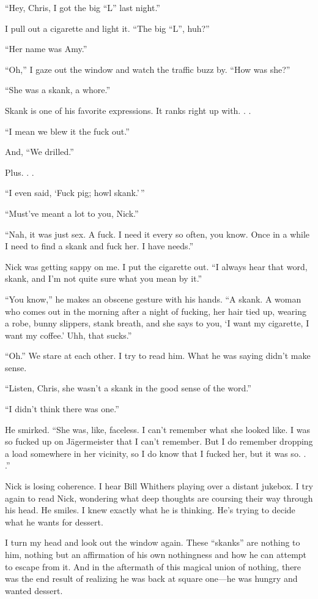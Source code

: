 ``Hey, Chris, I got the big ``L'' last night.''

I pull out a cigarette and light it. ``The big ``L'', huh?''

``Her name was Amy.''

``Oh,'' I gaze out the window and watch the traffic buzz by. ``How was
she?''

``She was a skank, a whore.''

Skank is one of his favorite expressions. It ranks right up with. . .

``I mean we blew it the fuck out.''

And, ``We drilled.''

Plus. . .

``I even said, `Fuck pig; howl skank.'\,''

``Must've meant a lot to you, Nick.''

``Nah, it was just sex. A fuck. I need it every so often, you know. Once
in a while I need to find a skank and fuck her. I have needs.''

Nick was getting sappy on me. I put the cigarette out. ``I always hear
that word, skank, and I'm not quite sure what you mean by it.''

``You know,'' he makes an obscene gesture with his hands. ``A skank. A
woman who comes out in the morning after a night of fucking, her hair
tied up, wearing a robe, bunny slippers, stank breath, and she says to
you, `I want my cigarette, I want my coffee.' Uhh, that sucks.''

``Oh.'' We stare at each other. I try to read him. What he was saying
didn't make sense.

``Listen, Chris, she wasn't a skank in the good sense of the word.''

``I didn't think there was one.''

He smirked. ``She was, like, faceless. I can't remember what she looked
like. I was so fucked up on Jägermeister that I can't remember. But I do
remember dropping a load somewhere in her vicinity, so I do know that I
fucked her, but it was so. . .''

Nick is losing coherence. I hear Bill Whithers playing over a distant
jukebox. I try again to read Nick, wondering what deep thoughts are
coursing their way through his head. He smiles. I knew exactly what he
is thinking. He's trying to decide what he wants for dessert.

I turn my head and look out the window again. These ``skanks'' are
nothing to him, nothing but an affirmation of his own nothingness and
how he can attempt to escape from it. And in the aftermath of this
magical union of nothing, there was the end result of realizing he was
back at square one---he was hungry and wanted dessert.

